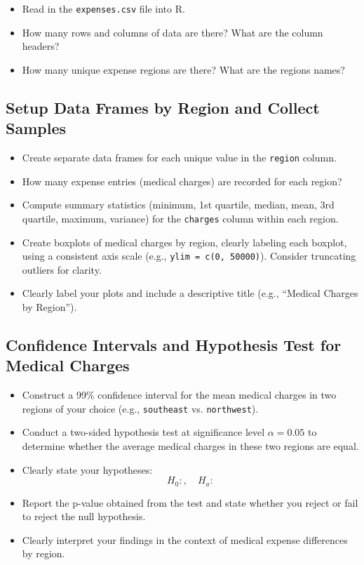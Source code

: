 \documentclass{article}
\begin{document}
\begin{itemize}
    \item Read in the \texttt{expenses.csv} file into R.
    \item How many rows and columns of data are there? What are the column headers?
    \item How many unique expense regions are there? What are the regions names?
\end{itemize}

\subsection*{Setup Data Frames by Region and Collect Samples}

\begin{itemize}
    \item Create separate data frames for each unique value in the \texttt{region} column.
    \item How many expense entries (medical charges) are recorded for each region?
    \item Compute summary statistics (minimum, 1st quartile, median, mean, 3rd quartile, maximum, variance) for the \texttt{charges} column within each region.
    \item Create boxplots of medical charges by region, clearly labeling each boxplot, using a consistent axis scale (e.g., \texttt{ylim = c(0, 50000)}). Consider truncating outliers for clarity.
    \item Clearly label your plots and include a descriptive title (e.g., ``Medical Charges by Region'').
\end{itemize}

\subsection*{Confidence Intervals and Hypothesis Test for Medical Charges}

\begin{itemize}
    \item Construct a 99\% confidence interval for the mean medical charges in two regions of your choice (e.g., \texttt{southeast} vs. \texttt{northwest}).
    \item Conduct a two-sided hypothesis test at significance level $\alpha = 0.05$ to determine whether the average medical charges in these two regions are equal.
    \item Clearly state your hypotheses:
    \[
    H_0: , \quad H_a:
    \]
    \item Report the p-value obtained from the test and state whether you reject or fail to reject the null hypothesis.
    \item Clearly interpret your findings in the context of medical expense differences by region.
\end{itemize}
\end{document}
